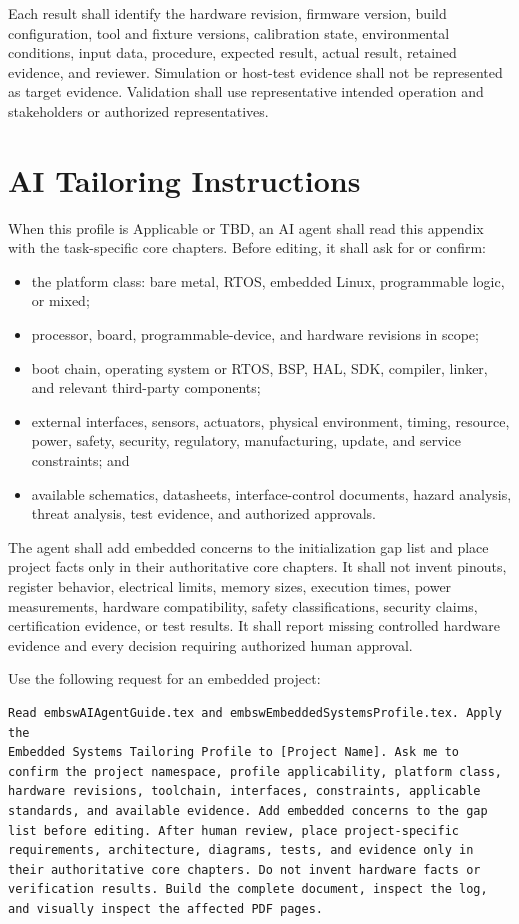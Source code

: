 Each result shall identify the hardware revision, firmware version, build
configuration, tool and fixture versions, calibration state, environmental
conditions, input data, procedure, expected result, actual result, retained
evidence, and reviewer. Simulation or host-test evidence shall not be
represented as target evidence. Validation shall use representative intended
operation and stakeholders or authorized representatives.

\section{AI Tailoring Instructions}
When this profile is Applicable or TBD, an AI agent shall read this appendix
with the task-specific core chapters. Before editing, it shall ask for or
confirm:

\begin{itemize}
\item the platform class: bare metal, RTOS, embedded Linux, programmable logic,
or mixed;
\item processor, board, programmable-device, and hardware revisions in scope;
\item boot chain, operating system or RTOS, BSP, HAL, SDK, compiler, linker,
and relevant third-party components;
\item external interfaces, sensors, actuators, physical environment, timing,
resource, power, safety, security, regulatory, manufacturing, update, and
service constraints; and
\item available schematics, datasheets, interface-control documents, hazard
analysis, threat analysis, test evidence, and authorized approvals.
\end{itemize}

The agent shall add embedded concerns to the initialization gap list and place
project facts only in their authoritative core chapters. It shall not invent
pinouts, register behavior, electrical limits, memory sizes, execution times,
power measurements, hardware compatibility, safety classifications, security
claims, certification evidence, or test results. It shall report missing
controlled hardware evidence and every decision requiring authorized human
approval.

Use the following request for an embedded project:

\begin{verbatim}
Read embswAIAgentGuide.tex and embswEmbeddedSystemsProfile.tex. Apply the
Embedded Systems Tailoring Profile to [Project Name]. Ask me to
confirm the project namespace, profile applicability, platform class,
hardware revisions, toolchain, interfaces, constraints, applicable
standards, and available evidence. Add embedded concerns to the gap
list before editing. After human review, place project-specific
requirements, architecture, diagrams, tests, and evidence only in
their authoritative core chapters. Do not invent hardware facts or
verification results. Build the complete document, inspect the log,
and visually inspect the affected PDF pages.
\end{verbatim}

